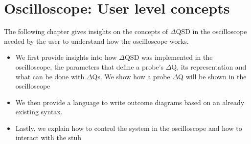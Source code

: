 \chapter{Oscilloscope: User level concepts}
    The following chapter gives insights on the concepts of $\Delta$QSD in the oscilloscope needed by the user to understand how the oscilloscope works.
    \begin{itemize}
        \item We first provide insights into how $\Delta$QSD was implemented in the oscilloscope, the parameters that define a probe's $\Delta$Q, its representation and what can be done with $\Delta$Qs. We show how a probe $\Delta$Q will be shown in the oscilloscope
        \item We then provide a language to write outcome diagrams based on an already existing syntax.
        \item Lastly, we explain how to control the system in the oscilloscope and how to interact with the stub
    \end{itemize}





%

